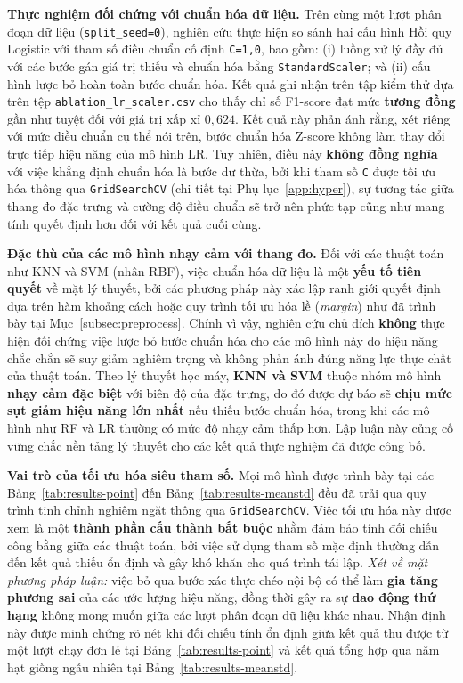 \documentclass[14pt,a4paper]{extreport}
\begin{document}
\textbf{Thực nghiệm đối chứng với chuẩn hóa dữ liệu.} Trên cùng một lượt phân đoạn dữ liệu (\texttt{split\_seed=0}), nghiên cứu thực hiện so sánh hai cấu hình Hồi quy Logistic với tham số điều chuẩn cố định \texttt{C=1,0}, bao gồm: (i) luồng xử lý đầy đủ với các bước gán giá trị thiếu và chuẩn hóa bằng \texttt{StandardScaler}; và (ii) cấu hình lược bỏ hoàn toàn bước chuẩn hóa. Kết quả ghi nhận trên tập kiểm thử dựa trên tệp \texttt{ablation\_lr\_scaler.csv} cho thấy chỉ số F1-score đạt mức \textbf{tương đồng} gần như tuyệt đối với giá trị xấp xỉ $0,624$. Kết quả này phản ánh rằng, xét riêng với mức điều chuẩn cụ thể nói trên, bước chuẩn hóa Z-score không làm thay đổi trực tiếp hiệu năng của mô hình LR. Tuy nhiên, điều này \textbf{không đồng nghĩa} với việc khẳng định chuẩn hóa là bước dư thừa, bởi khi tham số \texttt{C} được tối ưu hóa thông qua \texttt{GridSearchCV} (chi tiết tại Phụ lục~\ref{app:hyper}), sự tương tác giữa thang đo đặc trưng và cường độ điều chuẩn sẽ trở nên phức tạp cũng như mang tính quyết định hơn đối với kết quả cuối cùng.

\textbf{Đặc thù của các mô hình nhạy cảm với thang đo.} Đối với các thuật toán như KNN và SVM (nhân RBF), việc chuẩn hóa dữ liệu là một \textbf{yếu tố tiên quyết} về mặt lý thuyết, bởi các phương pháp này xác lập ranh giới quyết định dựa trên hàm khoảng cách hoặc quy trình tối ưu hóa lề (\textit{margin}) như đã trình bày tại Mục~\ref{subsec:preprocess}. Chính vì vậy, nghiên cứu chủ đích \textbf{không} thực hiện đối chứng việc lược bỏ bước chuẩn hóa cho các mô hình này do hiệu năng chắc chắn sẽ suy giảm nghiêm trọng và không phản ánh đúng năng lực thực chất của thuật toán. Theo lý thuyết học máy, \textbf{KNN và SVM} thuộc nhóm mô hình \textbf{nhạy cảm đặc biệt} với biên độ của đặc trưng, do đó được dự báo sẽ \textbf{chịu mức sụt giảm hiệu năng lớn nhất} nếu thiếu bước chuẩn hóa, trong khi các mô hình như RF và LR thường có mức độ nhạy cảm thấp hơn. Lập luận này củng cố vững chắc nền tảng lý thuyết cho các kết quả thực nghiệm đã được công bố.

\textbf{Vai trò của tối ưu hóa siêu tham số.} Mọi mô hình được trình bày tại các Bảng~\ref{tab:results-point} đến Bảng~\ref{tab:results-meanstd} đều đã trải qua quy trình tinh chỉnh nghiêm ngặt thông qua \texttt{GridSearchCV}. Việc tối ưu hóa này được xem là một \textbf{thành phần cấu thành bắt buộc} nhằm đảm bảo tính đối chiếu công bằng giữa các thuật toán, bởi việc sử dụng tham số mặc định thường dẫn đến kết quả thiếu ổn định và gây khó khăn cho quá trình tái lập. \emph{Xét về mặt phương pháp luận:} việc bỏ qua bước xác thực chéo nội bộ có thể làm \textbf{gia tăng phương sai} của các ước lượng hiệu năng, đồng thời gây ra sự \textbf{dao động thứ hạng} không mong muốn giữa các lượt phân đoạn dữ liệu khác nhau. Nhận định này được minh chứng rõ nét khi đối chiếu tính ổn định giữa kết quả thu được từ một lượt chạy đơn lẻ tại Bảng~\ref{tab:results-point} và kết quả tổng hợp qua năm hạt giống ngẫu nhiên tại Bảng~\ref{tab:results-meanstd}.
\end{document}
